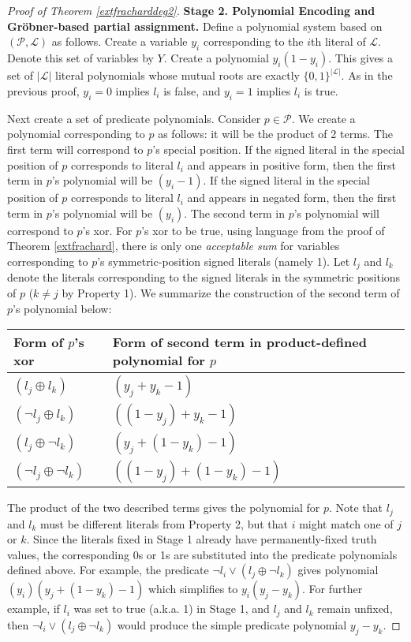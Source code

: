 \documentclass{article}
\begin{document}
\begin{proof}[Proof of Theorem \ref{extfracharddeg2}]
\vspace{2mm}
\noindent \textbf{Stage 2.  Polynomial Encoding and Gr\"{o}bner-based partial assignment. } Define a polynomial system based on $(\mathcal{P}, \mathcal{L})$ as follows. Create a variable $y_i$ corresponding to the $i$th literal of $\mathcal{L}$. Denote this set of variables by $Y$. Create a polynomial $y_i(1-y_i)$. This gives a set of $|\mathcal{L}|$ literal polynomials whose mutual roots are exactly $\{0,1\}^{|\mathcal{L}|}$. As in the previous proof, $y_i=0$ implies $l_i$ is false, and $y_i=1$ implies $l_i$ is true. 

Next create a set of predicate polynomials. Consider $p\in\mathcal{P}$.
We create a polynomial corresponding to $p$ as follows: it will be the product of 2 terms.  The first term will correspond to $p$'s special position. If the signed literal in the special position of $p$ corresponds to literal $l_i$ and appears in positive form, then the first term in $p$'s polynomial will be $(y_i-1)$. If the signed literal in the special position of $p$ corresponds to literal $l_i$ and appears in negated form, then the first term in $p$'s polynomial will be $(y_i)$. The second term in $p$'s polynomial will correspond to $p$'s xor.  For $p$'s xor to be true, using language from the proof of Theorem \ref{extfrachard}, there is only one \textit{acceptable sum} for variables corresponding to $p$'s symmetric-position signed literals (namely 1). Let $l_j$ and $l_k$ denote the literals corresponding to the signed literals in the symmetric positions of $p$ ($k\neq j$ by Property 1).  We summarize the construction of the second term of $p$'s polynomial below:\\

\begin{tabular}{l|l}
Form of $p$'s xor & Form of second term in product-defined polynomial for $p$\\ \hline
$(l_j\oplus l_k)$ & $(y_j+y_k-1)$ \\
$(\neg l_j\oplus l_k)$ & $((1-y_j)+y_k-1)$ \\
$(l_j\oplus \neg l_k)$ & $(y_j+(1-y_k)-1)$ \\
$(\neg l_j\oplus \neg l_k)$ & $((1-y_j)+(1-y_k)-1)$\\
\end{tabular}

\vspace{2mm}
The product of the two described terms gives the polynomial for $p$. Note that $l_j$ and $l_k$ must be different literals from Property 2, but that $i$ might match one of $j$ or $k$.  Since the literals fixed in Stage 1 already have permanently-fixed truth values, the corresponding 0s or 1s are substituted into the predicate polynomials defined above.  
For example, the predicate $\neg l_i \vee (l_j\oplus \neg l_k)$ gives polynomial $(y_i)(y_j+(1-y_k)-1)$ which simplifies to $y_i(y_j-y_k).$
For further example, if $l_i$ was set to true (a.k.a. 1) in Stage 1, and $l_j$ and $l_k$ remain unfixed, then $\neg l_i \vee (l_j\oplus \neg l_k)$ would produce the simple predicate polynomial $y_j-y_k.$


\end{proof}
\end{document}
